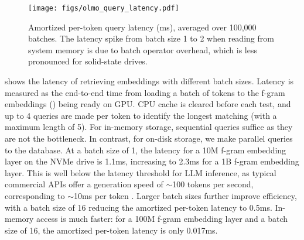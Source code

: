\begin{figure}[ht]
    \centering
    \texttt{[image: figs/olmo\_query\_latency.pdf]}
    \caption{Amortized per-token query latency (ms), averaged over 100,000 batches. The latency spike from batch size 1 to 2 when reading from system memory is due to batch operator overhead, which is less pronounced for solid-state drives. }

    \label{fig:latency}
\end{figure}

 shows the latency of retrieving embeddings with different batch sizes. Latency is measured as the end-to-end time from loading a batch of tokens to the f-gram embeddings () being ready on GPU. CPU cache is cleared before each test, and up to 4 queries are made per token to identify the longest matching  (with a maximum length of 5). For in-memory storage, sequential queries suffice as they are not the bottleneck. In contrast, for on-disk storage, we make parallel  queries to the database. At a batch size of 1, the latency for a 10M f-gram embedding layer on the NVMe drive is 1.1ms, increasing to 2.3ms for a 1B f-gram embedding layer. This is well below the latency threshold for LLM inference, as typical commercial APIs offer a generation speed of $\sim$100 tokens per second, corresponding to $\sim$10ms per token \citep{generation_speed}. Larger batch sizes further improve efficiency, with a batch size of 16 reducing the amortized per-token latency to 0.5ms. In-memory access is much faster:
for a 100M f-gram embedding layer and a batch size of 16, the amortized per-token latency is only 0.017ms.






